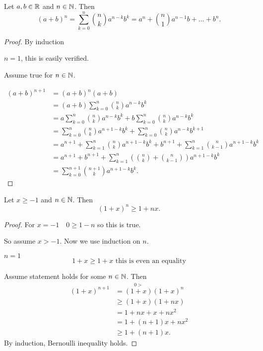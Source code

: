 \documentclass[10pt, a4paper]{article}
\begin{document}
\begin{theorem}\label{analy:thm:binom}
    Let $a, b \in \mathbb{R}$ and $n \in \mathbb{N}$. Then
    \[
    (a + b) ^ n = \sum_{k = 0}^{n}\binom{n}{k}a^{n - k}b^{k} = a ^ n + \binom{n}{1}a^{n - 1}b + \dotsc + b ^ n.
    \]
    \begin{proof}
        By induction

        $n = 1$, this is easily verified.

        Assume true for $n \in \mathbb{N}$.

        \begin{align*}
            (a + b) ^ {n + 1} &= (a + b)^n(a + b) \\
            &= (a + b)\sum_{k = 0}^{n}\binom{n}{k}a^{n - k}b^{k} \\
            &= a\sum_{k = 0}^{n}\binom{n}{k}a^{n - k}b^{k} + b\sum_{k = 0}^{n}\binom{n}{k}a^{n - k}b^{k} \\
            &= \sum_{k = 0}^{n}\binom{n}{k}a^{n + 1 - k}b^{k} + \sum_{k = 0}^{n}\binom{n}{k}a^{n - k}b^{k + 1} \\
            &= a ^ {n + 1} + \sum_{k = 1}^{n}\binom{n}{k}a^{n + 1 - k}b^{k} + b ^ {n + 1} + \sum_{k = 1}^{n}\binom{n}{k - 1}a^{n + 1 - k}b^{k} \\
            &= a ^ {n + 1} + b ^ {n + 1} + \sum_{k = 1}^{n}\left(\binom{n}{k} + \binom{n}{k - 1}\right)a^{n + 1 - k}b^{k} \\
            &= \sum_{k = 0}^{n + 1}\binom{n + 1}{k}a^{n + 1 - k}b^{k}.
        \end{align*}
    \end{proof}
\end{theorem}

\begin{theorem}\label{analy:thm:bernoineq}
    Let $x \geq -1$ and $n \in \mathbb{N}$. Then
    \[
    (1 + x) ^ n \geq 1 + nx.
    \]
    \begin{proof}
        For $x = -1\quad 0 \geq 1 - n$ so this is true.

        So assume $x > -1$. Now we use induction on $n$.

        $n = 1$
        \[
        1 + x \geq 1 + x\text{ this is even an equality}
        \]

        Assume statement holds for some $n \in \mathbb{N}$. Then
        \begin{align*}
            (1 + x) ^ {n + 1} &= \overset{0 >}{(1 + x)}(1 + x) ^ n \\
            &\geq (1 + x)(1 + nx) \\
            &= 1 + nx + x + nx ^ 2 \\
            &= 1 + (n + 1)x + nx ^ 2 \\
            &\geq 1 + (n + 1)x.
        \end{align*}
        By induction, Bernoulli inequality holds.
    \end{proof}
\end{theorem}
\end{document}
